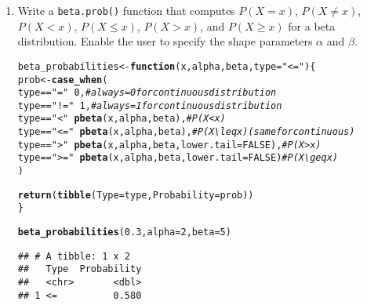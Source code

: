 \documentclass{article}\usepackage[]{graphicx}\usepackage[]{xcolor}
\makeatletter
\newcommand{\hlnum}[1]{\textcolor[rgb]{0.686,0.059,0.569}{#1}}%
\newcommand{\hlsng}[1]{\textcolor[rgb]{0.192,0.494,0.8}{#1}}%
\newcommand{\hlcom}[1]{\textcolor[rgb]{0.678,0.584,0.686}{\textit{#1}}}%
\newcommand{\hlopt}[1]{\textcolor[rgb]{0,0,0}{#1}}%
\newcommand{\hldef}[1]{\textcolor[rgb]{0.345,0.345,0.345}{#1}}%
\newcommand{\hlkwa}[1]{\textcolor[rgb]{0.161,0.373,0.58}{\textbf{#1}}}%
\newcommand{\hlkwb}[1]{\textcolor[rgb]{0.69,0.353,0.396}{#1}}%
\newcommand{\hlkwc}[1]{\textcolor[rgb]{0.333,0.667,0.333}{#1}}%
\newcommand{\hlkwd}[1]{\textcolor[rgb]{0.737,0.353,0.396}{\textbf{#1}}}%
\newenvironment{kframe}{%
 \def\at@end@of@kframe{}%
 \ifinner\ifhmode%
  \def\at@end@of@kframe{\end{minipage}}%
  \begin{minipage}{\columnwidth}%
 \fi\fi%
 \def\FrameCommand##1{\hskip\@totalleftmargin \hskip-\fboxsep
 \colorbox{shadecolor}{##1}\hskip-\fboxsep
     \hskip-\linewidth \hskip-\@totalleftmargin \hskip\columnwidth}%
 \MakeFramed {\advance\hsize-\width
   \@totalleftmargin\z@ \linewidth\hsize
   \@setminipage}}%
 {\par\unskip\endMakeFramed%
 \at@end@of@kframe}
\newenvironment{knitrout}{}{} %
\makeatother
\begin{document}
\begin{enumerate}
    \item Write a \texttt{beta.prob()} function that computes $P(X=x)$, 
    $P(X \neq x)$, $P(X<x)$, $P(X \leq x)$, $P(X > x)$, and $P(X \geq x)$
    for a beta distribution. Enable the user to specify the shape parameters
    $\alpha$ and $\beta$.
\begin{knitrout}\scriptsize
{}\color{fgcolor}\begin{kframe}
\begin{alltt}
\hldef{beta_probabilities} \hlkwb{<-} \hlkwa{function}\hldef{(}\hlkwc{x}\hldef{,} \hlkwc{alpha}\hldef{,} \hlkwc{beta}\hldef{,} \hlkwc{type} \hldef{=} \hlsng{"<="}\hldef{) \{}
    \hldef{prob} \hlkwb{<-} \hlkwd{case_when}\hldef{(}
      \hldef{type} \hlopt{==} \hlsng{"="}  \hlopt{~} \hlnum{0}\hldef{,}  \hlcom{#always = 0 for continuous distribution}
      \hldef{type} \hlopt{==} \hlsng{"!="} \hlopt{~} \hlnum{1}\hldef{,} \hlcom{#always = 1 for continuous distribution}
      \hldef{type} \hlopt{==} \hlsng{"<"}  \hlopt{~} \hlkwd{pbeta}\hldef{(x, alpha, beta),}  \hlcom{# P(X < x)}
      \hldef{type} \hlopt{==} \hlsng{"<="} \hlopt{~} \hlkwd{pbeta}\hldef{(x, alpha, beta),}  \hlcom{# P(X \textbackslash{}leq x) (same for continuous)}
      \hldef{type} \hlopt{==} \hlsng{">"}  \hlopt{~} \hlkwd{pbeta}\hldef{(x, alpha, beta,} \hlkwc{lower.tail} \hldef{=} \hlnum{FALSE}\hldef{),}  \hlcom{# P(X > x)}
      \hldef{type} \hlopt{==} \hlsng{">="} \hlopt{~} \hlkwd{pbeta}\hldef{(x, alpha, beta,} \hlkwc{lower.tail} \hldef{=} \hlnum{FALSE}\hldef{)}  \hlcom{# P(X \textbackslash{}geq x)}
    \hldef{)}

  \hlkwd{return}\hldef{(}\hlkwd{tibble}\hldef{(}\hlkwc{Type} \hldef{= type,} \hlkwc{Probability} \hldef{= prob))}
\hldef{\}}

\hlkwd{beta_probabilities}\hldef{(}\hlnum{0.3}\hldef{,} \hlkwc{alpha} \hldef{=} \hlnum{2}\hldef{,} \hlkwc{beta} \hldef{=} \hlnum{5}\hldef{)}
\end{alltt}
\begin{verbatim}
## # A tibble: 1 x 2
##   Type  Probability
##   <chr>       <dbl>
## 1 <=          0.580
\end{verbatim}
\end{kframe}
\end{knitrout}
\end{enumerate}

\end{document}
